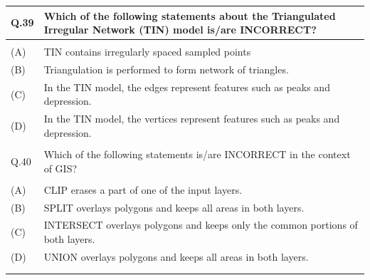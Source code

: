 \documentclass[12pt]{article}
\begin{document}
\begin{table}[H]
\renewcommand{\arraystretch}{3}
\setlength{\tabcolsep}{8pt}
\begin{tabular}{|l|p{15cm}|}
\hline
 
Q.39 & Which of the following statements about the Triangulated Irregular Network
(TIN) model is/are INCORRECT?\\ \hline 
 & \\ \hline
(A)&TIN contains irregularly spaced sampled points\\ \hline
(B)&Triangulation is performed to form network of triangles.\\ \hline
(C)&In the TIN model, the edges represent features such as peaks and depression.\\ \hline
(D)&In the TIN model, the vertices represent features such as peaks and depression.\\ \hline
 & \\ \hline

Q.40 & Which of the following statements is/are INCORRECT in the context of GIS?\\ \hline
 & \\ \hline
(A)&CLIP erases a part of one of the input layers.\\ \hline
(B)&SPLIT overlays polygons and keeps all areas in both layers.\\ \hline
(C)&INTERSECT overlays polygons and keeps only the common portions of both
layers.\\ \hline
(D)&UNION overlays polygons and keeps all areas in both layers.\\ \hline
 & \\ 
 
 & \\ \hline

 

\end{tabular}
\end{table}
\end{document}
